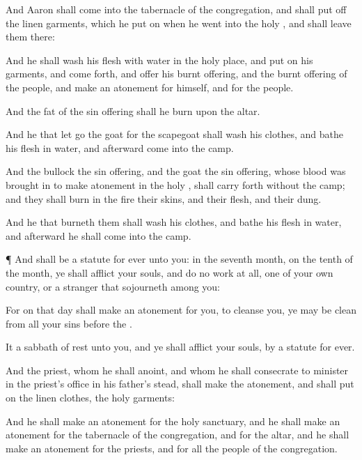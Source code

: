 {And
Aaron shall
come into the
tabernacle of the
congregation, and shall put
off the
linen
garments, which he put
on when he
went into the
holy
{}, and shall
leave them there:

And he shall
wash his
flesh with
water in the
holy
place, and put
on his
garments, and come
forth, and
offer his burnt
offering, and the burnt
offering of the
people, and make an
atonement for himself, and for the
people.

And the
fat of the sin
offering shall he
burn upon the
altar.

And he that let
go the
goat for the
scapegoat shall
wash his
clothes, and
bathe his
flesh in
water, and
afterward
come into the
camp.

And the
bullock
{} the sin
offering, and the
goat
{} the sin
offering, whose
blood was brought
in to make
atonement in the
holy
{}, shall
{} carry
forth
without the
camp; and they shall
burn in the
fire their
skins, and their
flesh, and their
dung.

And he that
burneth them shall
wash his
clothes, and
bathe his
flesh in
water, and
afterward he shall
come into the
camp.


\par }{\PP {}¶ And
{} shall be a
statute for
ever unto you:
{} in the
seventh
month, on the
tenth
{} of the
month, ye shall
afflict your
souls, and
do no
work at all,
{} one of your own
country, or a
stranger that
sojourneth
among you:

For on that
day shall
{} make an
atonement for you, to
cleanse you,
{} ye may be
clean from all your
sins
before the
{}.

It
{} a
sabbath of
rest unto you, and ye shall
afflict your
souls, by a
statute for
ever.

And the
priest, whom he shall
anoint, and whom he shall
consecrate to minister in the
priest’s office in his
father’s stead, shall make the
atonement, and shall put
on the
linen
clothes,
{} the
holy
garments:

And he shall make an
atonement for the
holy
sanctuary, and he shall make an
atonement for the
tabernacle of the
congregation, and for the
altar, and he shall make an
atonement for the
priests, and for all the
people of the
congregation.

}
